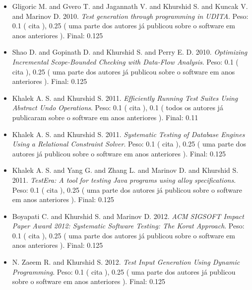 \begin{itemize}
\item Gligoric M. and Gvero T. and Jagannath V. and Khurshid S. and Kuncak V. and Marinov D.
      2010.
        \textit{ Test generation through programming in UDITA}.
      Peso:
      0.1 (
          cita
      ),
      0.25 (
uma parte dos autores já publicou sobre o software em anos anteriores
      ).
      Final:
      0.125

\item Shao D. and Gopinath D. and Khurshid S. and Perry E. D.
      2010.
        \textit{ Optimizing Incremental Scope-Bounded Checking with Data-Flow Analysis}.
      Peso:
      0.1 (
          cita
      ),
      0.25 (
uma parte dos autores já publicou sobre o software em anos anteriores
      ).
      Final:
      0.125

\item Khalek A. S. and Khurshid S.
      2011.
        \textit{ Efficiently Running Test Suites Using Abstract Undo Operations}.
      Peso:
      0.1 (
          cita
      ),
      0.1 (
todos os autores já publicaram sobre o software em anos anteriores
      ).
      Final:
      0.11

\item Khalek A. S. and Khurshid S.
      2011.
        \textit{ Systematic Testing of Database Engines Using a Relational Constraint Solver}.
      Peso:
      0.1 (
          cita
      ),
      0.25 (
uma parte dos autores já publicou sobre o software em anos anteriores
      ).
      Final:
      0.125

\item Khalek A. S. and Yang G. and Zhang L. and Marinov D. and Khurshid S.
      2011.
        \textit{ TestEra: A tool for testing Java programs using alloy specifications}.
      Peso:
      0.1 (
          cita
      ),
      0.25 (
uma parte dos autores já publicou sobre o software em anos anteriores
      ).
      Final:
      0.125

\item Boyapati C. and Khurshid S. and Marinov D.
      2012.
        \textit{ ACM SIGSOFT Impact Paper Award 2012: Systematic Software Testing: The Korat Approach}.
      Peso:
      0.1 (
          cita
      ),
      0.25 (
uma parte dos autores já publicou sobre o software em anos anteriores
      ).
      Final:
      0.125

\item N. Zaeem R. and Khurshid S.
      2012.
        \textit{ Test Input Generation Using Dynamic Programming}.
      Peso:
      0.1 (
          cita
      ),
      0.25 (
uma parte dos autores já publicou sobre o software em anos anteriores
      ).
      Final:
      0.125


\end{itemize}
